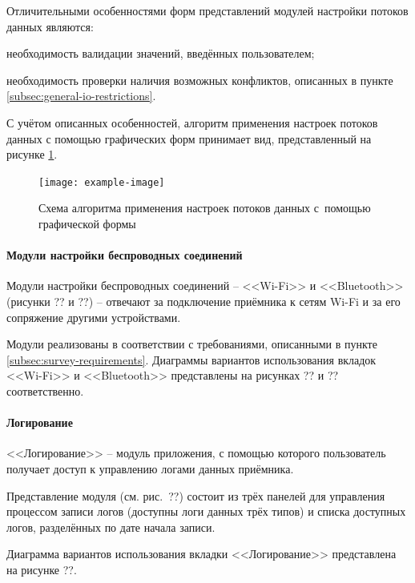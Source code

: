 Отличительными особенностями форм представлений модулей настройки потоков данных являются:
\begin{dashitemize}
  \item необходимость валидации значений, введённых пользователем;
  \item необходимость проверки наличия возможных конфликтов, описанных в пункте \ref{subsec:general-io-restrictions}.
\end{dashitemize}

С учётом описанных особенностей, алгоритм применения настроек потоков данных с помощью графических форм принимает вид, представленный на рисунке \ref{fig:io-form-apply}.

\begin{figure}[h!]
  \centering
  \setlength{\fboxsep}{5pt}
  \texttt{[image: example-image]}
  \vspace*{6pt}
  \caption{Схема алгоритма применения настроек потоков данных с~помощью графической формы}
  \label{fig:io-form-apply}
\end{figure}

\paragraph{Модули настройки беспроводных соединений}

Модули настройки беспроводных соединений -- <<Wi-Fi>> и <<Bluetooth>> (рисунки ?? и ??) -- отвечают за подключение приёмника к сетям Wi-Fi и за его сопряжение другими устройствами.

Модули реализованы в соответствии с требованиями, описанными в пункте \ref{subsec:survey-requirements}. Диаграммы вариантов использования вкладок <<Wi-Fi>> и <<Bluetooth>> представлены на рисунках ?? и ?? соответственно.

\paragraph{Логирование}

<<Логирование>> -- модуль приложения, с помощью которого пользователь получает доступ к управлению логами данных приёмника.

Представление модуля (см. рис.~??) состоит из трёх панелей для управления процессом записи логов (доступны логи данных трёх типов) и списка доступных логов, разделённых по дате начала записи.

Диаграмма вариантов использования вкладки <<Логирование>> представлена на рисунке ??.


